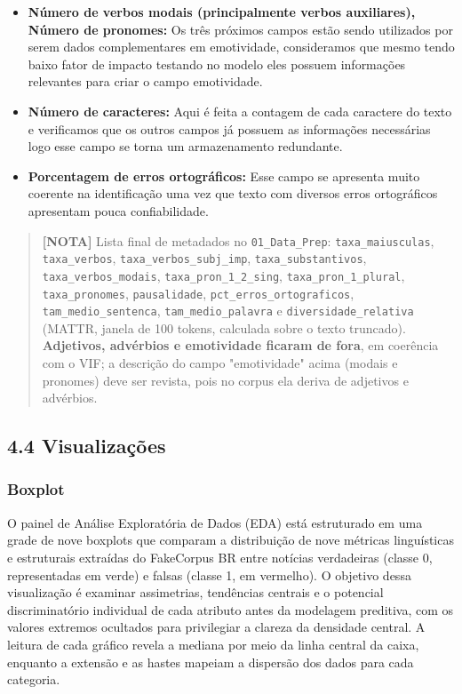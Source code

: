 \documentclass[
  brazilian,
  11pt,
]{article}
\begin{document}
\begin{itemize}
\item
  \textbf{Número de verbos modais (principalmente verbos auxiliares), Número de pronomes:} Os três próximos campos estão sendo utilizados por serem dados complementares em emotividade, consideramos que mesmo tendo baixo fator de impacto testando no modelo eles possuem informações relevantes para criar o campo emotividade.
\item
  \textbf{Número de caracteres:} Aqui é feita a contagem de cada caractere do texto e verificamos que os outros campos já possuem as informações necessárias logo esse campo se torna um armazenamento redundante.
\item
  \textbf{Porcentagem de erros ortográficos:} Esse campo se apresenta muito coerente na identificação uma vez que texto com diversos erros ortográficos apresentam pouca confiabilidade.
\end{itemize}

\begin{quote}
\textbf{{[}NOTA{]}} Lista final de metadados no \texttt{01\_Data\_Prep}: \texttt{taxa\_maiusculas}, \texttt{taxa\_verbos}, \texttt{taxa\_verbos\_subj\_imp}, \texttt{taxa\_substantivos}, \texttt{taxa\_verbos\_modais}, \texttt{taxa\_pron\_1\_2\_sing}, \texttt{taxa\_pron\_1\_plural}, \texttt{taxa\_pronomes}, \texttt{pausalidade}, \texttt{pct\_erros\_ortograficos}, \texttt{tam\_medio\_sentenca}, \texttt{tam\_medio\_palavra} e \texttt{diversidade\_relativa} (MATTR, janela de 100 tokens, calculada sobre o texto truncado). \textbf{Adjetivos, advérbios e emotividade ficaram de fora}, em coerência com o VIF; a descrição do campo "emotividade" acima (modais e pronomes) deve ser revista, pois no corpus ela deriva de adjetivos e advérbios.
\end{quote}

\subsection{4.4 Visualizações}\label{visualizauxe7uxf5es}

\subsubsection{Boxplot}\label{boxplot}

O painel de Análise Exploratória de Dados (EDA) está estruturado em uma grade de nove boxplots que comparam a distribuição de nove métricas linguísticas e estruturais extraídas do FakeCorpus BR entre notícias verdadeiras (classe 0, representadas em verde) e falsas (classe 1, em vermelho). O objetivo dessa visualização é examinar assimetrias, tendências centrais e o potencial discriminatório individual de cada atributo antes da modelagem preditiva, com os valores extremos ocultados para privilegiar a clareza da densidade central. A leitura de cada gráfico revela a mediana por meio da linha central da caixa, enquanto a extensão e as hastes mapeiam a dispersão dos dados para cada categoria.
\end{document}

